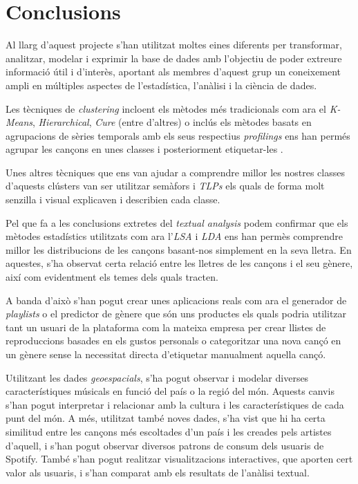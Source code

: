 \section{Conclusions}

Al llarg d'aquest projecte s'han utilitzat moltes eines diferents per transformar, analitzar, modelar i exprimir la base de dades amb l'objectiu de poder extreure informació útil i d'interès, aportant als membres d'aquest grup un coneixement ampli en múltiples aspectes de l'estadística, l'anàlisi i la ciència de dades.

Les tècniques de \textit{clustering} incloent els mètodes més tradicionals com ara el \textit{K-Means}, \textit{Hierarchical}, \textit{Cure} (entre d'altres) o inclús els mètodes basats en agrupacions de sèries temporals amb els seus respectius \textit{profilings} ens han permés agrupar les cançons en unes classes i posteriorment etiquetar-les .

Unes altres tècniques que ens van ajudar a comprendre millor les nostres classes d'aquests clústers van ser utilitzar semàfors i \textit{TLPs} els quals de forma molt senzilla i visual explicaven i describien cada classe. 


Pel que fa a les conclusions extretes del \textit{textual analysis} podem confirmar que els mètodes estadístics utilitzats com ara l'\textit{LSA} i \textit{LDA} ens han permès comprendre millor les distribucions de les cançons basant-nos simplement en la seva lletra. En aquestes, s'ha observat certa relació entre les lletres de les cançons i el seu gènere, així com evidentment els temes dels quals tracten.

A banda d'això s'han pogut crear unes aplicacions reals com ara el generador de \textit{playlists} o el predictor de gènere que són uns productes els quals podria utilitzar tant un usuari de la plataforma com la mateixa empresa per crear llistes de reproduccions basades en els gustos personals o categoritzar una nova cançó en un gènere sense la necessitat directa d'etiquetar manualment aquella cançó.

Utilitzant les dades \textit{geoespacials}, s'ha pogut observar i modelar diverses característiques músicals en funció del país o la regió del món. Aquests canvis s'han pogut interpretar i relacionar amb la cultura i les característiques de cada punt del món. A més, utilitzat també noves dades, s'ha vist que hi ha certa similitud entre les cançons més escoltades d'un país i les creades pels artistes d'aquell, i s'han pogut observar diversos patrons de consum dels usuaris de Spotify. També s'han pogut realitzar visualitzacions interactives, que aporten cert valor als usuaris, i s'han comparat amb els resultats de l'anàlisi textual.


